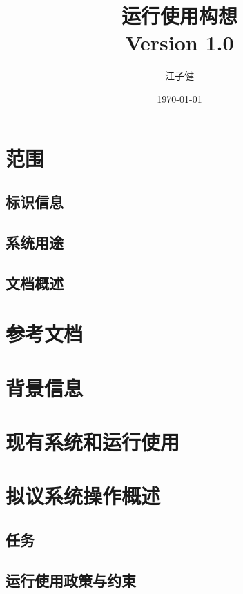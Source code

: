 \documentclass{ctexart}
\title{运行使用构想\\{\large Version 1.0}}
\author{江子健}
\date{\today}
\begin{document}
\maketitle
\newpage

\tableofcontents

\newpage
\section{范围}

\subsection{标识信息}

\subsection{系统用途}

\subsection{文档概述}

\newpage
\section{参考文档}



\newpage
\section{背景信息}

\newpage
\section{现有系统和运行使用}

\newpage
\section{拟议系统操作概述}

\subsection{任务}

\subsection{运行使用政策与约束}
\end{document}
